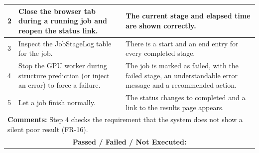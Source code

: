 \documentclass{FastFyp}
\begin{document}
{\begin{longtable}{|p{2.4cm}|p{4.6cm}|p{2.4cm}|p{3.8cm}|}
2 & Close the browser tab during a running job and reopen the status link. & \multicolumn{2}{p{6.64cm}|}{The current stage and elapsed time are shown correctly.} \\ \hline
3 & Inspect the JobStageLog table for the job. & \multicolumn{2}{p{6.64cm}|}{There is a start and an end entry for every completed stage.} \\ \hline
4 & Stop the GPU worker during structure prediction (or inject an error) to force a failure. & \multicolumn{2}{p{6.64cm}|}{The job is marked as failed, with the failed stage, an understandable error message and a recommended action.} \\ \hline
5 & Let a job finish normally. & \multicolumn{2}{p{6.64cm}|}{The status changes to completed and a link to the results page appears.} \\ \hline
\multicolumn{4}{|p{14.51cm}|}{\textbf{Comments:} Step 4 checks the requirement that the system does not show a silent poor result (FR-16).} \\ \hline
\multicolumn{4}{|c|}{\textbf{Passed / Failed / Not Executed:}} \\ \hline
\end{longtable}
}
\end{document}
